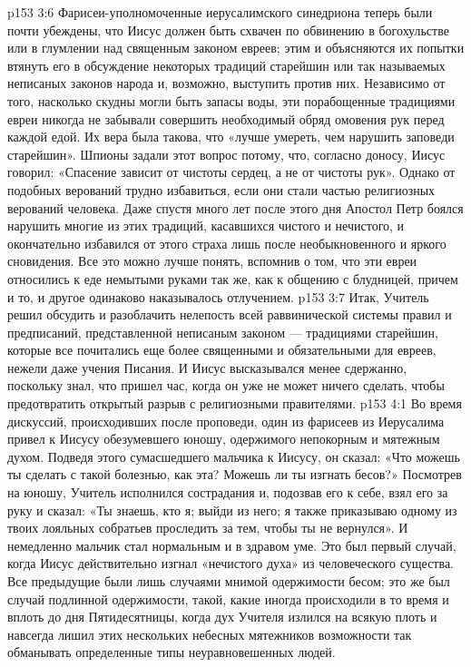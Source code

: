 \vs p153 3:6 Фарисеи\hyp{}уполномоченные иерусалимского синедриона теперь были почти убеждены, что Иисус должен быть схвачен по обвинению в богохульстве или в глумлении над священным законом евреев; этим и объясняются их попытки втянуть его в обсуждение некоторых традиций старейшин или так называемых неписаных законов народа и, возможно, выступить против них. Независимо от того, насколько скудны могли быть запасы воды, эти порабощенные традициями евреи никогда не забывали совершить необходимый обряд омовения рук перед каждой едой. Их вера была такова, что «лучше умереть, чем нарушить заповеди старейшин». Шпионы задали этот вопрос потому, что, согласно доносу, Иисус говорил: «Спасение зависит от чистоты сердец, а не от чистоты рук». Однако от подобных верований трудно избавиться, если они стали частью религиозных верований человека. Даже спустя много лет после этого дня Апостол Петр боялся нарушить многие из этих традиций, касавшихся чистого и нечистого, и окончательно избавился от этого страха лишь после необыкновенного и яркого сновидения. Все это можно лучше понять, вспомнив о том, что эти евреи относились к еде немытыми руками так же, как к общению с блудницей, причем и то, и другое одинаково наказывалось отлучением.
\vs p153 3:7 Итак, Учитель решил обсудить и разоблачить нелепость всей раввинической системы правил и предписаний, представленной неписаным законом --- традициями старейшин, которые все почитались еще более священными и обязательными для евреев, нежели даже учения Писания. И Иисус высказывался менее сдержанно, поскольку знал, что пришел час, когда он уже не может ничего сделать, чтобы предотвратить открытый разрыв с религиозными правителями.
\vs p153 4:1 Во время дискуссий, происходивших после проповеди, один из фарисеев из Иерусалима привел к Иисусу обезумевшего юношу, одержимого непокорным и мятежным духом. Подведя этого сумасшедшего мальчика к Иисусу, он сказал: «Что можешь ты сделать с такой болезнью, как эта? Можешь ли ты изгнать бесов?» Посмотрев на юношу, Учитель исполнился сострадания и, подозвав его к себе, взял его за руку и сказал: «Ты знаешь, кто я; выйди из него; я также приказываю одному из твоих лояльных собратьев проследить за тем, чтобы ты не вернулся». И немедленно мальчик стал нормальным и в здравом уме. Это был первый случай, когда Иисус действительно изгнал «нечистого духа» из человеческого существа. Все предыдущие были лишь случаями мнимой одержимости бесом; это же был случай подлинной одержимости, такой, какие иногда происходили в то время и вплоть до дня Пятидесятницы, когда дух Учителя излился на всякую плоть и навсегда лишил этих нескольких небесных мятежников возможности так обманывать определенные типы неуравновешенных людей.
